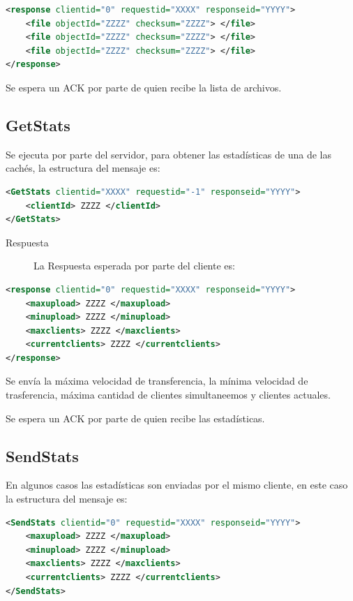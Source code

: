 \begin{lstlisting}[language=XML,caption=Mensaje de Respuesta de GetListOfFiles]
<response clientid="0" requestid="XXXX" responseid="YYYY"> 
	<file objectId="ZZZZ" checksum="ZZZZ"> </file>
	<file objectId="ZZZZ" checksum="ZZZZ"> </file>
	<file objectId="ZZZZ" checksum="ZZZZ"> </file>
</response>
\end{lstlisting}

Se espera un ACK por parte de quien recibe la lista de archivos.

\subsection{GetStats}
Se ejecuta por parte del servidor, para obtener las estadísticas de una de las cachés, la estructura del mensaje es:

\begin{lstlisting}[language=XML,caption=Mensaje de GetStats]
<GetStats clientid="XXXX" requestid="-1" responseid="YYYY"> 
	<clientId> ZZZZ </clientId>
</GetStats>
\end{lstlisting}



\begin{description}
\item[Respuesta] La Respuesta esperada por parte del cliente es:
\end{description}

\begin{lstlisting}[language=XML,caption=Mensaje de Respuesta de GetStats]
<response clientid="0" requestid="XXXX" responseid="YYYY"> 
	<maxupload> ZZZZ </maxupload>
	<minupload> ZZZZ </minupload>
	<maxclients> ZZZZ </maxclients>
	<currentclients> ZZZZ </currentclients>
</response>
\end{lstlisting}

Se envía la máxima velocidad de transferencia, la mínima velocidad de trasferencia, máxima cantidad de clientes simultaneemos y clientes actuales.

Se espera un ACK por parte de quien recibe las estadísticas.

\subsection{SendStats}

En algunos casos las estadísticas son enviadas por el mismo cliente, en este caso la estructura del mensaje es:

\begin{lstlisting}[language=XML,caption=Mensaje de SendStats]
<SendStats clientid="0" requestid="XXXX" responseid="YYYY"> 
	<maxupload> ZZZZ </maxupload>
	<minupload> ZZZZ </minupload>
	<maxclients> ZZZZ </maxclients>
	<currentclients> ZZZZ </currentclients>
</SendStats>
\end{lstlisting}

